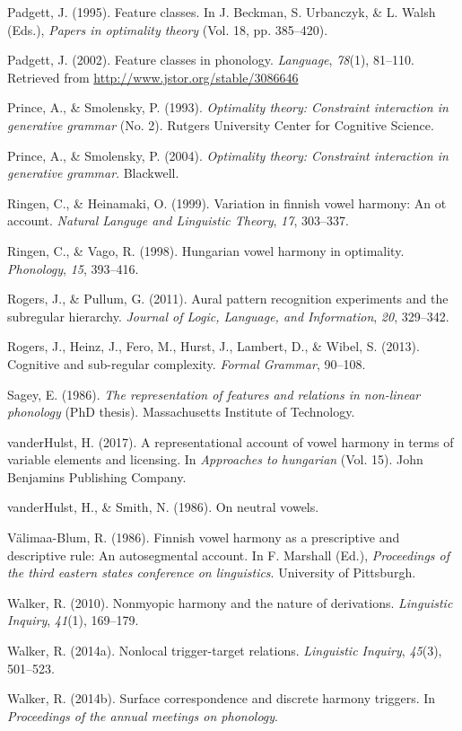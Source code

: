 \documentclass[,doc,floatsintext]{apa6}
\theoremstyle{definition}
\theoremstyle{definition}
\theoremstyle{definition}
\theoremstyle{remark}
\begin{document}
\hypertarget{ref-padgett1995}{}
Padgett, J. (1995). Feature classes. In J. Beckman, S. Urbanczyk, \& L.
Walsh (Eds.), \emph{Papers in optimality theory} (Vol. 18, pp.
385--420).

\hypertarget{ref-padgett2002}{}
Padgett, J. (2002). Feature classes in phonology. \emph{Language},
\emph{78}(1), 81--110. Retrieved from
\url{http://www.jstor.org/stable/3086646}

\hypertarget{ref-princesmolensky1993}{}
Prince, A., \& Smolensky, P. (1993). \emph{Optimality theory: Constraint
interaction in generative grammar} (No. 2). Rutgers University Center
for Cognitive Science.

\hypertarget{ref-princesmolensky2004}{}
Prince, A., \& Smolensky, P. (2004). \emph{Optimality theory: Constraint
interaction in generative grammar}. Blackwell.

\hypertarget{ref-ringenheinamaki1999}{}
Ringen, C., \& Heinamaki, O. (1999). Variation in finnish vowel harmony:
An ot account. \emph{Natural Languge and Linguistic Theory}, \emph{17},
303--337.

\hypertarget{ref-ringenvago1998}{}
Ringen, C., \& Vago, R. (1998). Hungarian vowel harmony in optimality.
\emph{Phonology}, \emph{15}, 393--416.

\hypertarget{ref-rogerspullum2011}{}
Rogers, J., \& Pullum, G. (2011). Aural pattern recognition experiments
and the subregular hierarchy. \emph{Journal of Logic, Language, and
Information}, \emph{20}, 329--342.

\hypertarget{ref-rogersetal2013}{}
Rogers, J., Heinz, J., Fero, M., Hurst, J., Lambert, D., \& Wibel, S.
(2013). Cognitive and sub-regular complexity. \emph{Formal Grammar},
90--108.

\hypertarget{ref-sagey1986}{}
Sagey, E. (1986). \emph{The representation of features and relations in
non-linear phonology} (PhD thesis). Massachusetts Institute of
Technology.

\hypertarget{ref-vdHulst2017}{}
vanderHulst, H. (2017). A representational account of vowel harmony in
terms of variable elements and licensing. In \emph{Approaches to
hungarian} (Vol. 15). John Benjamins Publishing Company.

\hypertarget{ref-vdHulstSmith1986}{}
vanderHulst, H., \& Smith, N. (1986). On neutral vowels.

\hypertarget{ref-valimaablum1986}{}
Välimaa-Blum, R. (1986). Finnish vowel harmony as a prescriptive and
descriptive rule: An autosegmental account. In F. Marshall (Ed.),
\emph{Proceedings of the third eastern states conference on
linguistics}. University of Pittsburgh.

\hypertarget{ref-walker2010}{}
Walker, R. (2010). Nonmyopic harmony and the nature of derivations.
\emph{Linguistic Inquiry}, \emph{41}(1), 169--179.

\hypertarget{ref-walkeroroquen}{}
Walker, R. (2014a). Nonlocal trigger-target relations. \emph{Linguistic
Inquiry}, \emph{45}(3), 501--523.

\hypertarget{ref-walker2014}{}
Walker, R. (2014b). Surface correspondence and discrete harmony
triggers. In \emph{Proceedings of the annual meetings on phonology}.
\end{document}

